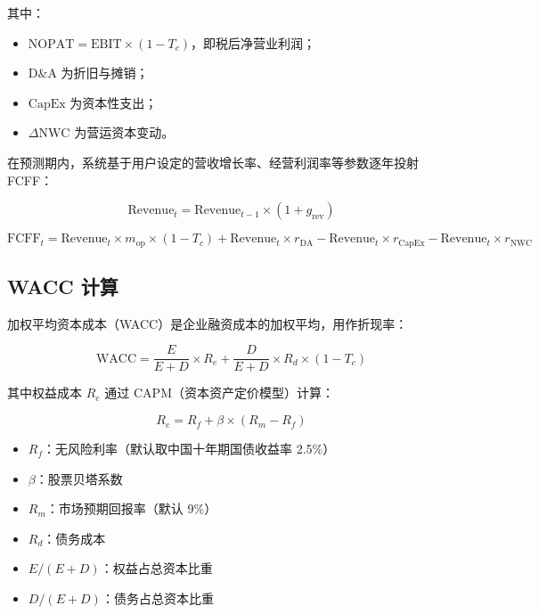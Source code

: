 \documentclass[12pt,a4paper]{article}
\begin{document}
其中：
\begin{itemize}[leftmargin=2em]
  \item $\text{NOPAT} = \text{EBIT} \times (1 - T_c)$，即税后净营业利润；
  \item $\text{D\&A}$ 为折旧与摊销；
  \item $\text{CapEx}$ 为资本性支出；
  \item $\Delta\text{NWC}$ 为营运资本变动。
\end{itemize}

在预测期内，系统基于用户设定的营收增长率、经营利润率等参数逐年投射 FCFF：

\begin{equation}
\text{Revenue}_t = \text{Revenue}_{t-1} \times (1 + g_{\text{rev}})
\end{equation}

\begin{equation}
\text{FCFF}_t = \text{Revenue}_t \times m_{\text{op}} \times (1 - T_c) + \text{Revenue}_t \times r_{\text{DA}} - \text{Revenue}_t \times r_{\text{CapEx}} - \text{Revenue}_t \times r_{\text{NWC}}
\end{equation}

\subsection{WACC 计算}

加权平均资本成本（WACC）是企业融资成本的加权平均，用作折现率：

\begin{equation}
\text{WACC} = \frac{E}{E+D} \times R_e + \frac{D}{E+D} \times R_d \times (1 - T_c)
\label{eq:wacc}
\end{equation}

其中权益成本 $R_e$ 通过 CAPM（资本资产定价模型）计算：

\begin{equation}
R_e = R_f + \beta \times (R_m - R_f)
\label{eq:capm}
\end{equation}

\begin{itemize}[leftmargin=2em]
  \item $R_f$：无风险利率（默认取中国十年期国债收益率 2.5\%）
  \item $\beta$：股票贝塔系数
  \item $R_m$：市场预期回报率（默认 9\%）
  \item $R_d$：债务成本
  \item $E/(E+D)$：权益占总资本比重
  \item $D/(E+D)$：债务占总资本比重
\end{itemize}
\end{document}
